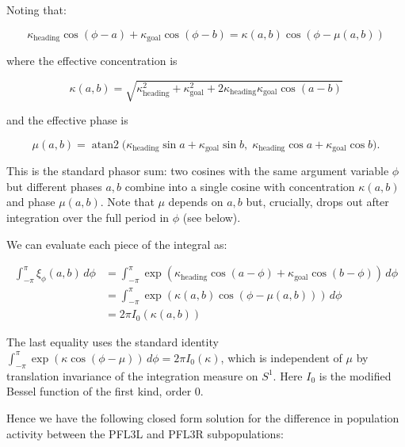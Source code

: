 \documentclass[11pt]{article}
\begin{document}
Noting that:

\begin{equation*}
\kappa_{\text{heading}} \cos(\phi - a) + \kappa_{\text{goal}} \cos(\phi - b) = \kappa(a, b) \cos(\phi - \mu(a,b))
\end{equation*}

where the effective concentration is

\begin{equation*}
\kappa(a, b) = \sqrt{\kappa_{\text{heading}}^2 + \kappa_{\text{goal}}^2 + 2\kappa_{\text{heading}}\kappa_{\text{goal}} \cos(a - b)}
\end{equation*}

and the effective phase is

\begin{equation*}
\mu(a, b) = \operatorname{atan2}\big(\kappa_{\text{heading}}\sin a + \kappa_{\text{goal}}\sin b,\; \kappa_{\text{heading}}\cos a + \kappa_{\text{goal}}\cos b\big).
\end{equation*}

This is the standard phasor sum: two cosines with the same argument variable $\phi$ but different phases $a, b$ combine into a single cosine with concentration $\kappa(a,b)$ and phase $\mu(a,b)$. Note that $\mu$ depends on $a, b$ but, crucially, drops out after integration over the full period in $\phi$ (see below).

We can evaluate each piece of the integral as:

\begin{equation}
\begin{aligned}
\int_{-\pi}^{\pi} \xi_\phi(a, b)\, d\phi &= \int_{-\pi}^{\pi} \exp(\kappa_{\text{heading}} \cos(a - \phi) + \kappa_{\text{goal}} \cos(b - \phi))\, d\phi \\
&= \int_{-\pi}^{\pi} \exp(\kappa(a, b) \cos(\phi - \mu(a,b)))\, d\phi \\
&= 2\pi I_0(\kappa(a, b))
\end{aligned}
\end{equation}

The last equality uses the standard identity $\int_{-\pi}^{\pi} \exp(\kappa \cos(\phi - \mu))\, d\phi = 2\pi I_0(\kappa)$, which is independent of $\mu$ by translation invariance of the integration measure on $S^1$. Here $I_0$ is the modified Bessel function of the first kind, order 0.

Hence we have the following closed form solution for the difference in population activity between the PFL3L and PFL3R subpopulations:
\end{document}

